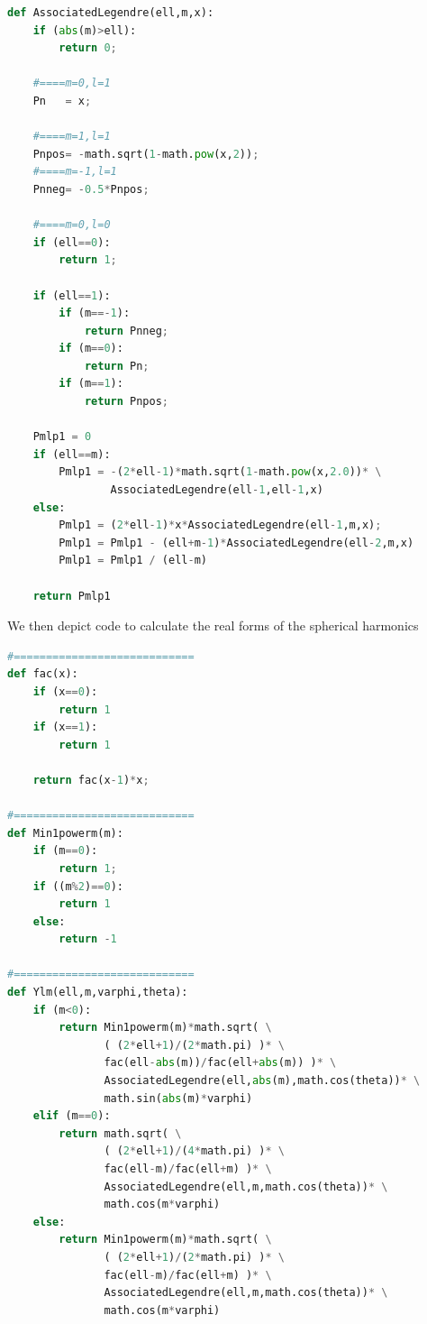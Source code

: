\documentclass[11pt,letterpaper,titlepage]{article}
\numberwithin{equation}{section}
\begin{document}
\begin{lstlisting}[language=python]
def AssociatedLegendre(ell,m,x):
    if (abs(m)>ell):
        return 0;
    
    #====m=0,l=1
    Pn   = x;
    
    #====m=1,l=1
    Pnpos= -math.sqrt(1-math.pow(x,2));
    #====m=-1,l=1
    Pnneg= -0.5*Pnpos;
    
    #====m=0,l=0
    if (ell==0):
        return 1;
    
    if (ell==1):
        if (m==-1):
            return Pnneg;
        if (m==0):
            return Pn;
        if (m==1):
            return Pnpos;

    Pmlp1 = 0
    if (ell==m):
        Pmlp1 = -(2*ell-1)*math.sqrt(1-math.pow(x,2.0))* \
                AssociatedLegendre(ell-1,ell-1,x)
    else:
        Pmlp1 = (2*ell-1)*x*AssociatedLegendre(ell-1,m,x);
        Pmlp1 = Pmlp1 - (ell+m-1)*AssociatedLegendre(ell-2,m,x)
        Pmlp1 = Pmlp1 / (ell-m)
    
    return Pmlp1 
\end{lstlisting}

\newpage
We then depict code to calculate the real forms of the spherical harmonics

\begin{lstlisting}[language=python]
#============================
def fac(x):
    if (x==0):
        return 1
    if (x==1):
        return 1
    
    return fac(x-1)*x;

#============================
def Min1powerm(m):
    if (m==0):
        return 1;
    if ((m%2)==0):
        return 1
    else:
        return -1

#============================    
def Ylm(ell,m,varphi,theta):
    if (m<0):
        return Min1powerm(m)*math.sqrt( \
               ( (2*ell+1)/(2*math.pi) )* \
               fac(ell-abs(m))/fac(ell+abs(m)) )* \
               AssociatedLegendre(ell,abs(m),math.cos(theta))* \
               math.sin(abs(m)*varphi)
    elif (m==0):
        return math.sqrt( \
               ( (2*ell+1)/(4*math.pi) )* \
               fac(ell-m)/fac(ell+m) )* \
               AssociatedLegendre(ell,m,math.cos(theta))* \
               math.cos(m*varphi)
    else:
        return Min1powerm(m)*math.sqrt( \
               ( (2*ell+1)/(2*math.pi) )* \
               fac(ell-m)/fac(ell+m) )* \
               AssociatedLegendre(ell,m,math.cos(theta))* \
               math.cos(m*varphi)
\end{lstlisting}
\end{document}
